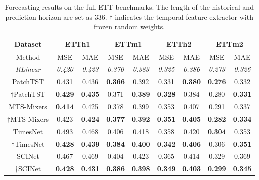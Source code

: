 \documentclass{article}
\begin{document}
\begin{table}[ht]
    \centering
    \caption{Forecasting results on the full ETT benchmarks. The length of the historical and prediction horizon are set as 336. $\dagger$ indicates the temporal feature extractor with frozen random weights.}
    \label{tab:1}
    \vskip 0.15in
    \setlength\tabcolsep{7pt}
    \begin{small}
    \begin{tabular}{c|cc|cc|cc|cc}
    \toprule
    Dataset & \multicolumn{2}{c|}{ETTh1} & \multicolumn{2}{c|}{ETTm1} & \multicolumn{2}{c|}{ETTh2} & \multicolumn{2}{c}{ETTm2} \\
    \midrule
    Method & MSE & MAE & MSE & MAE & MSE & MAE & MSE & MAE \\
    \midrule
    \textit{RLinear} & \textit{0.420} & \textit{0.423} & \textit{0.370} & \textit{0.383} & \textit{0.325} & \textit{0.386} & \textit{0.273} & \textit{0.326} \\
    \midrule\midrule
    PatchTST & 0.431 & 0.436 & \textbf{0.366} & 0.392 & 0.331 & \textbf{0.380} & \textbf{0.276} & 0.332 \\[1mm]
    $\dagger$PatchTST & \textbf{0.429} & \textbf{0.435} & 0.371 & \textbf{0.389} & \textbf{0.328} & 0.384 & 0.280 & \textbf{0.331} \\
    \midrule\midrule
    MTS-Mixers & \textbf{0.414} & 0.425 & 0.378 & 0.399 & 0.353 & 0.407 & 0.291 & 0.337 \\[1mm]
    $\dagger$MTS-Mixers & 0.423 & \textbf{0.424} & \textbf{0.377} & \textbf{0.392} & \textbf{0.351} & \textbf{0.405} & \textbf{0.282} & \textbf{0.334} \\
    \midrule\midrule
    TimesNet & 0.493 & 0.468 & 0.406 & 0.418 & 0.358 & 0.420 & \textbf{0.304} & 0.353 \\[1mm]
    $\dagger$TimesNet & \textbf{0.428} & \textbf{0.439} & \textbf{0.384} & \textbf{0.400} & \textbf{0.342} & \textbf{0.406} & 0.306 & \textbf{0.351} \\
    \midrule\midrule
    SCINet & 0.467 & 0.469 & 0.404 & 0.423 & 0.365 & 0.414 & 0.329 & 0.369 \\[1mm]
    $\dagger$SCINet & \textbf{0.428} & \textbf{0.431} & \textbf{0.386} & \textbf{0.398} & \textbf{0.349} & \textbf{0.403} & \textbf{0.299} & \textbf{0.345} \\
    \bottomrule
    \end{tabular}
    \end{small}
\end{table}
\end{document}
